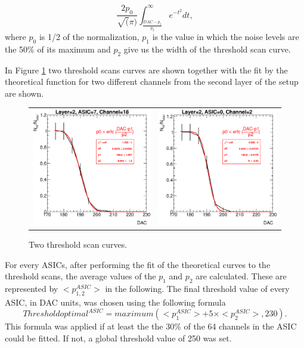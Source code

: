 \documentclass[a4paper,11pt]{article}
\begin{document}
\begin{equation}
\frac{2p_{0}}{\sqrt(\pi)} \int_{\frac{DAC-p_{1}}{p_{2}}}^{\infty} e^{-t^{2}} dt,
\label{eq_S-curve}
\end{equation}
where $p_{0}$ is 1/2 of the normalization, $p_{1}$ is the value in which the noise levels are 
the 50\% of its maximum and $p_{2}$ give us the width of the threshold scan curve. 

In Figure \ref{scurve_channels} 
two threshold scans curves are shown together with the fit by
the theoretical function for two different channels from the second
layer of the setup are shown.

\begin{figure}[!ht]
  \centering
  \begin{tabular}{ll}
  \includegraphics[width=2.8in]{../figs/commissioning/scurve_chn18_asic7_layer2.eps} & \includegraphics[width=2.8in]{../figs/commissioning/scurve_chn2_asic0_layer2.eps}
  \end{tabular}
\caption{Two threshold scan curves.}
\label{scurve_channels}
\end{figure}


For every ASICs, after performing the fit of the theoretical curves
to the threshold scans, the average values of the   $p_{1}$ and $p_{2}$ are calculated.
These are represented by $<p_{1,2}^{ASIC}>$ in the following.
The final threshold value of every ASIC, in DAC units, was chosen 
using the following formula
\begin{equation}
Threshold{optimal}^{ASIC} =maximum(<p_{1}^{ASIC}> + 5 \times <p_{2}^{ASIC}>,230).
\end{equation}
This formula was applied 
if at least the the 30\% of the 64 channels in the ASIC could be fitted.
If not, a global threshold value of 250 was set.
\end{document}
